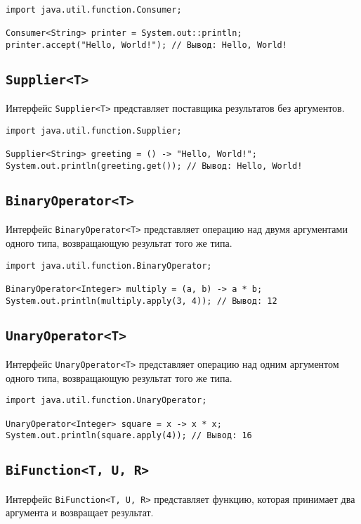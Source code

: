 \documentclass[12pt, a4paper]{article}
\begin{document}
\begin{verbatim}
import java.util.function.Consumer;

Consumer<String> printer = System.out::println;
printer.accept("Hello, World!"); // Вывод: Hello, World!
\end{verbatim}

\subsection*{\texttt{Supplier<T>}}
Интерфейс \texttt{Supplier<T>} представляет поставщика результатов без аргументов.

\begin{verbatim}
import java.util.function.Supplier;

Supplier<String> greeting = () -> "Hello, World!";
System.out.println(greeting.get()); // Вывод: Hello, World!
\end{verbatim}

\subsection*{\texttt{BinaryOperator<T>}}
Интерфейс \texttt{BinaryOperator<T>} представляет операцию над двумя аргументами одного типа, возвращающую результат того же типа.

\begin{verbatim}
import java.util.function.BinaryOperator;

BinaryOperator<Integer> multiply = (a, b) -> a * b;
System.out.println(multiply.apply(3, 4)); // Вывод: 12
\end{verbatim}

\subsection*{\texttt{UnaryOperator<T>}}
Интерфейс \texttt{UnaryOperator<T>} представляет операцию над одним аргументом одного типа, возвращающую результат того же типа.

\begin{verbatim}
import java.util.function.UnaryOperator;

UnaryOperator<Integer> square = x -> x * x;
System.out.println(square.apply(4)); // Вывод: 16
\end{verbatim}

\subsection*{\texttt{BiFunction<T, U, R>}}
Интерфейс \texttt{BiFunction<T, U, R>} представляет функцию, которая принимает два аргумента и возвращает результат.
\end{document}
